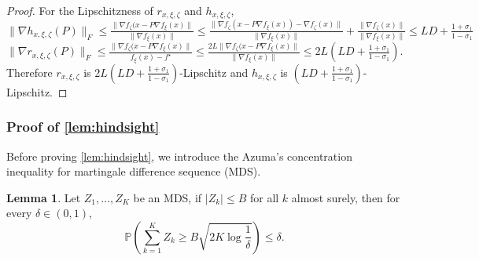 \documentclass{article}
\theoremstyle{definition}
\newtheorem{lemma}[lemma]{Lemma}
\begin{document}
\begin{proof}
  For the Lipschitzness of $r_{x, \xi, \zeta}$ and $h_{x, \xi, \zeta}$,
  \[ \| \nabla h_{x, \xi, \zeta} (P) \|_F \leq \tfrac{\| \nabla f_{\zeta} (x -
     P \nabla f_{\xi} (x) \|}{\| \nabla f_{\xi} (x) \|} \leq
     \tfrac{\| \nabla f_{\zeta} (x - P \nabla f_{\xi} (x)) - \nabla f_{\zeta}
     (x) \|}{\| \nabla f_{\xi} (x) \|} + \tfrac{\| \nabla f_{\zeta} (x) \|}{\|
     \nabla f_{\xi} (x) \|} \leq L D + \tfrac{1 + \sigma_1}{1 - \sigma_1} \]
  \[ \| \nabla r_{x, \xi, \zeta} (P) \|_F \leq \tfrac{\| \nabla f_{\zeta} (x -
     P \nabla f_{\xi} (x) \|}{f_{\xi} (x) - f^{\star}} \leq
     \tfrac{2 L \| \nabla f_{\zeta} (x - P \nabla f_{\xi} (x)
     \|}{\| \nabla f_{\xi} (x) \|} \leq 2 L \left( L D + \tfrac{1 +
     \sigma_1}{1 - \sigma_1} \right) . \]
  Therefore $r_{x, \xi, \zeta}$ is $2 L \left( L D + \tfrac{1 + \sigma_1}{1 -
  \sigma_1} \right)$-Lipschitz and $h_{x, \xi, \zeta}$ is $\left( L D +
  \tfrac{1 + \sigma_1}{1 - \sigma_1} \right)$-Lipschitz.
\end{proof}


\subsubsection{Proof of \cref{lem:hindsight}}


Before proving \cref{lem:hindsight}, we introduce the Azuma's
concentration inequality for martingale difference sequence (MDS).

\begin{lemma}
  \label{lem:azuma}
  Let $Z_1, \ldots, Z_K$ be an MDS, if $| Z_k | \leq B$ for
  all $k$ almost surely, then for every $\delta \in (0, 1)$,
  \[ \mathbb{P} \left( \textstyle \sum_{k = 1}^K Z_k \geq B \sqrt{2 K \log \frac{1}{\delta}}
     \right) \leq \delta . \]
\end{lemma}
\end{document}
